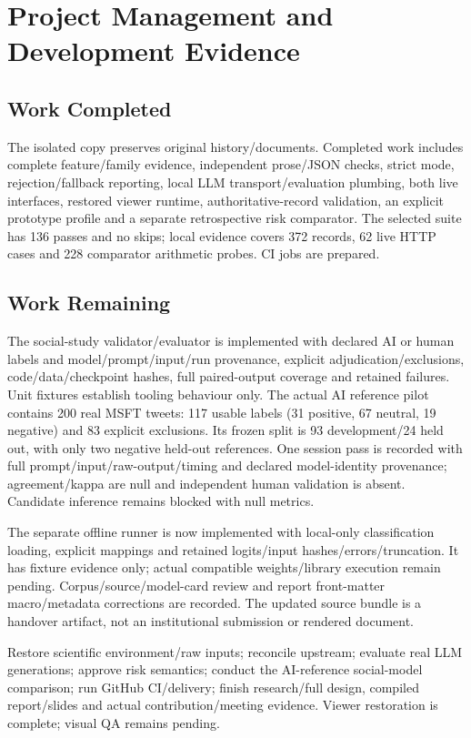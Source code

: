 \chapter{Project Management and Development Evidence}
\section{Work Completed}
The isolated copy preserves original history/documents. Completed work includes complete feature/family evidence, independent prose/JSON checks, strict mode, rejection/fallback reporting, local LLM transport/evaluation plumbing, both live interfaces, restored viewer runtime, authoritative-record validation, an explicit prototype profile and a separate retrospective risk comparator. The selected suite has 136 passes and no skips; local evidence covers 372 records, 62 live HTTP cases and 228 comparator arithmetic probes. CI jobs are prepared.
\section{Work Remaining}
The social-study validator/evaluator is implemented with declared AI or human labels and model/prompt/input/run provenance, explicit adjudication/exclusions, code/data/checkpoint hashes, full paired-output coverage and retained failures. Unit fixtures establish tooling behaviour only. The actual AI reference pilot contains 200 real MSFT tweets: 117 usable labels (31 positive, 67 neutral, 19 negative) and 83 explicit exclusions. Its frozen split is 93 development/24 held out, with only two negative held-out references. One session pass is recorded with full prompt/input/raw-output/timing and declared model-identity provenance; agreement/kappa are null and independent human validation is absent. Candidate inference remains blocked with null metrics.

The separate offline runner is now implemented with local-only classification loading, explicit mappings and retained logits/input hashes/errors/truncation. It has fixture evidence only; actual compatible weights/library execution remain pending. Corpus/source/model-card review and report front-matter macro/metadata corrections are recorded. The updated source bundle is a handover artifact, not an institutional submission or rendered document.

Restore scientific environment/raw inputs; reconcile upstream; evaluate real LLM generations; approve risk semantics; conduct the AI-reference social-model comparison; run GitHub CI/delivery; finish research/full design, compiled report/slides and actual contribution/meeting evidence. Viewer restoration is complete; visual QA remains pending.
